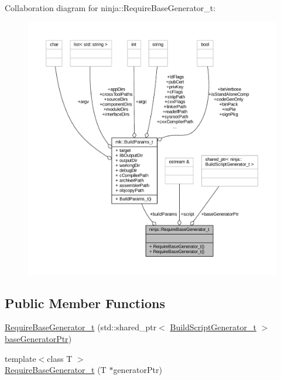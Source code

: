 Collaboration diagram for ninja\+:\+:Require\+Base\+Generator\+\_\+t\+:
\nopagebreak
\begin{figure}[H]
\begin{center}
\leavevmode
\includegraphics[width=350pt]{structninja_1_1_require_base_generator__t__coll__graph}
\end{center}
\end{figure}
\subsection*{Public Member Functions}
\begin{DoxyCompactItemize}
\item 
\hyperlink{structninja_1_1_require_base_generator__t_ae3808e345cf06745dc1466b4e1004b67}{Require\+Base\+Generator\+\_\+t} (std\+::shared\+\_\+ptr$<$ \hyperlink{classninja_1_1_build_script_generator__t}{Build\+Script\+Generator\+\_\+t} $>$ \hyperlink{structninja_1_1_require_base_generator__t_a3a16080268acf0b71c18eed619429f6a}{base\+Generator\+Ptr})
\item 
{\footnotesize template$<$class T $>$ }\\\hyperlink{structninja_1_1_require_base_generator__t_aaba8d25ee686cbb50dcfe46cdf6b87d4}{Require\+Base\+Generator\+\_\+t} (T $\ast$generator\+Ptr)
\end{DoxyCompactItemize}

